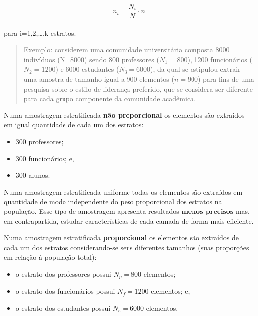 \documentclass[
]{book}
\providecommand{\tightlist}{%
  \setlength{\itemsep}{0pt}\setlength{\parskip}{0pt}}
\begin{document}
\hfill\break

\[
n_{i} =  \frac{N_{i}}{N} \cdot n
\]\\

para i=1,2,\ldots,k estratos.

\hfill\break

\begin{quote}
Exemplo: considerem uma comunidade universitária composta 8000 indivíduos (N=8000) sendo 800 professores (\(N_{1}=800\)), 1200 funcionários (\(N_{2}=1200\)) e 6000 estudantes (\(N_{3}=6000\)), da qual se estipulou extrair uma amostra de tamanho igual a 900 elementos (\(n=900\)) para fins de uma pesquisa sobre o estilo de liderança preferido, que se considera ser diferente para cada grupo componente da comunidade acadêmica.
\end{quote}

\hfill\break

Numa amostragem estratificada \textbf{não proporcional} os elementos são extraídos em igual quantidade de cada um dos estratos:

\hfill\break

\begin{itemize}
\tightlist
\item
  300 professores;\\
\item
  300 funcionários; e,\\
\item
  300 alunos.
\end{itemize}

\hfill\break

Numa amostragem estratificada uniforme todas os elementos são extraídos em quantidade de modo independente do peso proporcional dos estratos na população. Esse tipo de amostragem apresenta resultados \textbf{menos precisos} mas, em contrapartida, estudar características de cada camada de forma mais eficiente.

\hfill\break

Numa amostragem estratificada \textbf{proporcional} os elementos são extraídos de cada um dos estratos considerando-se seus diferentes tamanhos (suas proporções em relação à população total):

\hfill\break

\begin{itemize}
\tightlist
\item
  o estrato dos professores possui \(N_{p}=800\) elementos;
\item
  o estrato dos funcionários possui \(N_{f}=1200\) elementos; e,
\item
  o estrato dos estudantes possui \(N_{e}=6000\) elementos.
\end{itemize}
\end{document}

